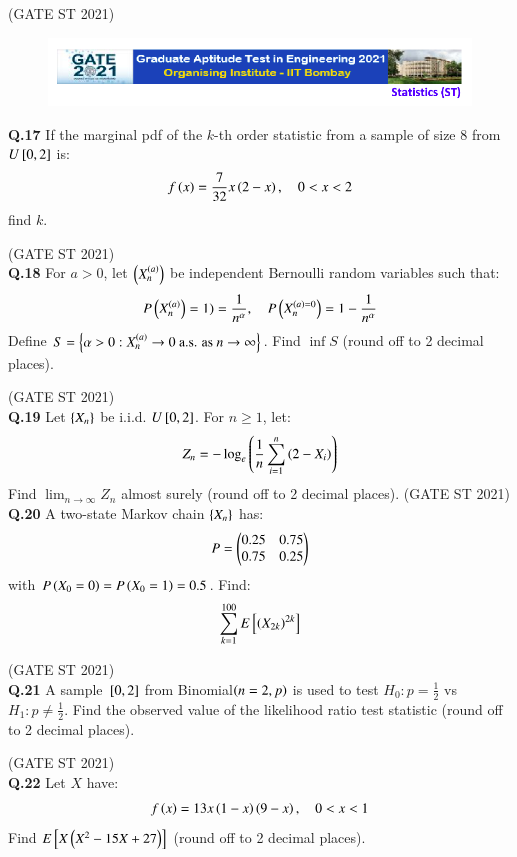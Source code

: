 \documentclass[journal,12pt,onecolumn]{IEEEtran}
\theoremstyle{remark}
\begin{document}
\hfill (GATE ST 2021) \\

\begin{figure}
 \centering
    \includegraphics[width=1\linewidth]{figs/0.png} 
\end{figure}
\textbf{Q.17}
If the marginal pdf of the $k$-th order statistic from a sample of size 8 from $U{}\left[0,2\right]$ is:
\[
f\left(x\right) = \frac{7}{32} x \left(2-x\right), \quad 0 < x < 2
\]
find $k$.

\hfill (GATE ST 2021) \\

\textbf{Q.18}
For $a > 0$, let $\left( X_n^{\left(a\right)} \right)$ be independent Bernoulli random variables such that:
\[
P\left(X_n^{\left(a\right)}\right) = 1) = \frac{1}{n^\alpha}, \quad P\left(X_n^{\left(a\right) = 0}\right) = 1 - \frac{1}{n^\alpha}
\]
Define $S = \left\{ \alpha > 0 : X_n^{\left(a\right)} \to 0 \ \text{a.s. as} \ n \to \infty \right\}$.  
Find $\inf S$ (round off to 2 decimal places).

\hfill (GATE ST 2021) \\

\textbf{Q.19}
Let $\left\{X_n\right\}$ be i.i.d. $U{}\left[0,2\right]$. For $n \ge 1$, let:
\[
Z_n = - \log_e \left( \frac{1}{n} \sum_{i=1}^n \left(2 - X_i\right) \right)
\]
Find $\lim_{n \to \infty} Z_n$ almost surely (round off to 2 decimal places).
\hfill (GATE ST 2021) \\

\textbf{Q.20}
A two-state Markov chain $\left\{X_n\right\}$ has:
\[
P = \begin{pmatrix} 0.25 & 0.75 \\ 0.75 & 0.25 \end{pmatrix}
\]
with $P\left(X_0 = 0\right) = P\left(X_0 = 1\right) = 0.5$. Find:
\[
\sum_{k=1}^{100} E{}\left[\left(X_{2k}\right)^{2k}\right]
\]

\hfill (GATE ST 2021) \\

\textbf{Q.21}
A sample ${}\left[0,2\right]$ from Binomial$\left(n=2,p\right)$ is used to test $H_0: p = \frac12$ vs $H_1: p \ne \frac12$.  
Find the observed value of the likelihood ratio test statistic (round off to 2 decimal places).

\hfill (GATE ST 2021) \\

\textbf{Q.22}
Let $X$ have:
\[
f\left(x\right) = 13x\left(1-x\right)\left(9-x\right), \quad 0 < x < 1
\]
Find $E{}\left[ X\left(X^2 - 15X + 27\right)\right]$ (round off to 2 decimal places).
\end{document}
